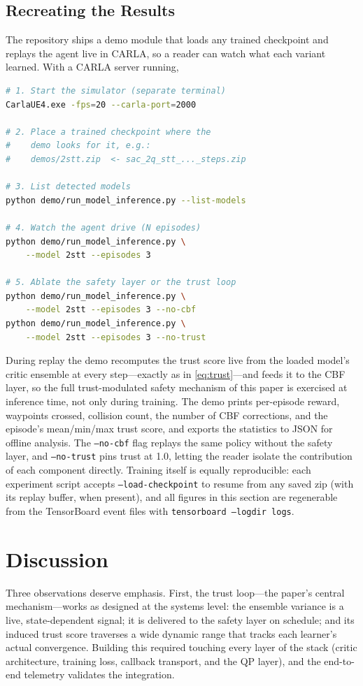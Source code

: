 \documentclass[conference]{IEEEtran}
\begin{document}
\subsection{Recreating the Results}
\label{sec:recreate}
The repository ships a demo module that loads any trained checkpoint and replays the agent live in CARLA, so a reader can watch what each variant learned. With a CARLA server running,

\begin{lstlisting}[language=bash, caption={Replaying a trained agent with the demo module}, label={lst:demo}]
# 1. Start the simulator (separate terminal)
CarlaUE4.exe -fps=20 --carla-port=2000

# 2. Place a trained checkpoint where the
#    demo looks for it, e.g.:
#    demos/2stt.zip  <- sac_2q_stt_..._steps.zip

# 3. List detected models
python demo/run_model_inference.py --list-models

# 4. Watch the agent drive (N episodes)
python demo/run_model_inference.py \
    --model 2stt --episodes 3

# 5. Ablate the safety layer or the trust loop
python demo/run_model_inference.py \
    --model 2stt --episodes 3 --no-cbf
python demo/run_model_inference.py \
    --model 2stt --episodes 3 --no-trust
\end{lstlisting}

During replay the demo recomputes the trust score live from the loaded model's critic ensemble at every step---exactly as in \eqref{eq:trust}---and feeds it to the CBF layer, so the full trust-modulated safety mechanism of this paper is exercised at inference time, not only during training. The demo prints per-episode reward, waypoints crossed, collision count, the number of CBF corrections, and the episode's mean/min/max trust score, and exports the statistics to JSON for offline analysis. The \texttt{--no-cbf} flag replays the same policy without the safety layer, and \texttt{--no-trust} pins trust at 1.0, letting the reader isolate the contribution of each component directly. Training itself is equally reproducible: each experiment script accepts \texttt{--load-checkpoint} to resume from any saved zip (with its replay buffer, when present), and all figures in this section are regenerable from the TensorBoard event files with \texttt{tensorboard --logdir logs}.

\section{Discussion}
Three observations deserve emphasis. First, the trust loop---the paper's central mechanism---works as designed at the systems level: the ensemble variance is a live, state-dependent signal; it is delivered to the safety layer on schedule; and its induced trust score traverses a wide dynamic range that tracks each learner's actual convergence. Building this required touching every layer of the stack (critic architecture, training loss, callback transport, and the QP layer), and the end-to-end telemetry validates the integration.
\end{document}
